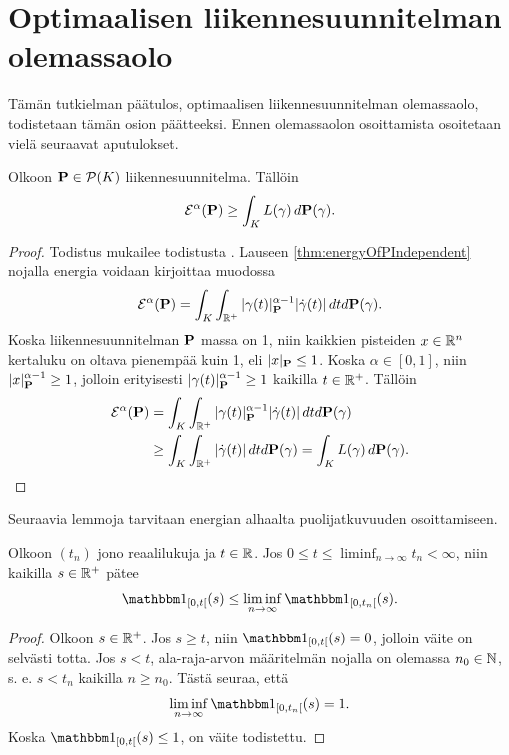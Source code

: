 \documentclass[12pt,oneside,a4paper]{amsbook} %
\begin{document}
\section{Optimaalisen liikennesuunnitelman olemassaolo}
Tämän tutkielman päätulos, optimaalisen liikennesuunnitelman olemassaolo, todistetaan tämän osion päätteeksi. Ennen olemassaolon osoittamista osoitetaan vielä seuraavat aputulokset.
\begin{lemma}\label{le:nrgGeThanLength}
    Olkoon $\P \in \mathcal{P}(K)$ liikennesuunnitelma. Tällöin
        \begin{equation*}
            \E^\alpha(\P) \ge \int_K L(\gamma) \, d\P(\gamma).
        \end{equation*}
\end{lemma}

\begin{proof}
    Todistus mukailee todistusta \cite[s. 36]{optimal}. Lauseen \ref{thm:energyOfPIndependent} nojalla energia voidaan kirjoittaa muodossa
    \begin{equation*}
        \E^\alpha(\P) = \int_K \int_{\R^+}|\gamma(t)|^{\alpha-1}_\P|\dot\gamma(t)| \, dtd\P(\gamma).
    \end{equation*}
     Koska liikennesuunnitelman $\P$ massa on 1, niin kaikkien pisteiden $x \in \R^n$ kertaluku on oltava pienempää kuin 1, eli  $|x|_\P \le 1$. Koska $\alpha \in [0, 1]$, niin  $|x|^{\alpha-1}_\P \ge 1$, jolloin erityisesti $|\gamma(t)|^{\alpha-1}_\P \ge 1$ kaikilla $t \in \Rp$. Tällöin
    \begin{align*}
        \E^\alpha(\P) &= \int_K \int_{\R^+}|\gamma(t)|^{\alpha-1}_\P|\dot\gamma(t)| \, dtd\P(\gamma) \\ 
        &\ge \int_K \int_{\R^+}|\dot\gamma(t)| \, dtd\P(\gamma) = \int_K L(\gamma) \, d\P(\gamma).
    \end{align*}
\end{proof}

Seuraavia lemmoja tarvitaan energian alhaalta puolijatkuvuuden osoittamiseen.
\begin{lemma} \label{le:indFct}
    Olkoon $(t_n)$ jono reaalilukuja ja $t\in \R$.
    Jos $\displaystyle 0 \le t \le \liminf_{n\to\infty} t_n < \infty$, niin kaikilla $s \in \Rp$ pätee
         \begin{equation*}
             \indfct{[0, t[}(s) \le \liminf_{n\to\infty} \indfct{[0, t_n[}(s).
         \end{equation*}
 \end{lemma}
\begin{proof}
    Olkoon $s \in \Rp$. Jos $s \ge t$, niin $\indfct{[0, t[}(s) = 0$, jolloin väite on selvästi totta.
    Jos $s < t$, ala-raja-arvon määritelmän nojalla on olemassa $n_0 \in \N$, s. e. $s < t_n$ kaikilla $n \ge n_0$. Tästä seuraa, että
        \begin{equation*}
            \liminf_{n \to \infty} \indfct{[0, t_n[}(s) = 1.
        \end{equation*}
    Koska $\indfct{[0, t[}(s) \le 1$, on väite todistettu.
\end{proof} 
\end{document}
